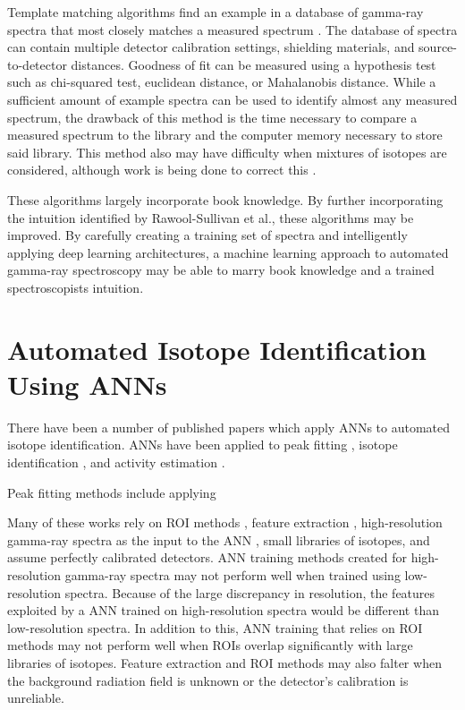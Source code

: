 Template matching algorithms find an example in a database of gamma-ray spectra that most closely matches a measured spectrum \cite{burr2009}. The database of spectra can contain multiple detector calibration settings, shielding materials, and source-to-detector distances. Goodness of fit can be measured using a hypothesis test such as chi-squared test, euclidean distance, or Mahalanobis distance. While a sufficient amount of example spectra can be used to identify almost any measured spectrum, the drawback of this method is the time necessary to compare a measured spectrum to the library and the computer memory necessary to store said library. This method also may have difficulty when mixtures of isotopes are considered, although work is being done to correct this \cite{mattingly2010}.

These algorithms largely incorporate book knowledge. By further incorporating the intuition identified by Rawool-Sullivan et al., these algorithms may be improved. By carefully creating a training set of spectra and intelligently applying deep learning architectures, a machine learning approach to automated gamma-ray spectroscopy may be able to marry book knowledge and a trained spectroscopists intuition.


\section{Automated Isotope Identification Using ANNs}

There have been a number of published papers which apply ANNs to automated isotope identification. ANNs have been applied to peak fitting \cite{Abdel-Aal2002}, isotope identification \cite{Abdel-Aal1996, Medhat2012}, and activity estimation \cite{Abdel-Aal1996, Vigneron1996}. 

Peak fitting methods include applying 


Many of these works rely on ROI methods \cite{Pilato1999}, feature extraction \cite{Chen2009}, high-resolution gamma-ray spectra as the input to the ANN \cite{Yoshida2002}, small libraries of isotopes, and assume perfectly calibrated detectors. ANN training methods created for high-resolution gamma-ray spectra may not perform well when trained using low-resolution spectra. Because of the large discrepancy in resolution, the features exploited by a ANN trained on high-resolution spectra would be different than low-resolution spectra. In addition to this, ANN training that relies on ROI methods may not perform well when ROIs overlap significantly with large libraries of isotopes. Feature extraction and ROI methods may also falter when the background radiation field is unknown or the detector's calibration is unreliable.  

